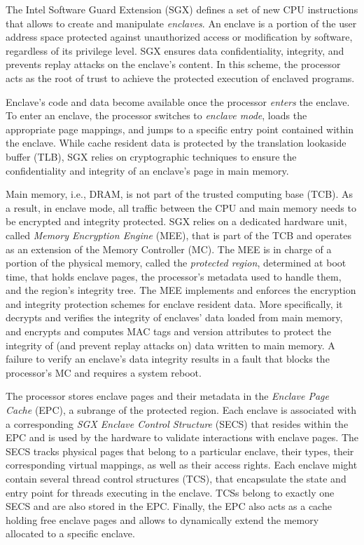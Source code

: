 % 
The Intel Software Guard Extension (SGX) defines a set of new CPU instructions that allows to create and manipulate \emph{enclaves}.
An enclave is a portion of the user address space protected against unauthorized access or modification by software, regardless of its privilege level.
SGX ensures data confidentiality, integrity, and prevents replay attacks on the enclave's content.
In this scheme, the processor acts as the root of trust to achieve the protected execution of enclaved programs.

Enclave's code and data become available once the processor \emph{enters} the enclave.
To enter an enclave, the processor switches to \emph{enclave mode}, loads the appropriate page mappings, and jumps to a specific entry point contained within the enclave.
While cache resident data is protected by the translation lookaside buffer (TLB), SGX relies on cryptographic techniques to ensure the confidentiality and integrity of an enclave's page in main memory.

Main memory, i.e., DRAM, is not part of the trusted computing base (TCB).
As a result, in enclave mode, all traffic between the CPU and main memory needs to be encrypted and integrity protected.
SGX relies on a dedicated hardware unit, called \emph{Memory Encryption Engine} (MEE), that is part of the TCB and operates as an extension of the Memory Controller (MC).
The MEE is in charge of a portion of the physical memory, called the \emph{protected region}, determined at boot time, that holds enclave pages, the processor's metadata used to handle them, and the region's integrity tree.
The MEE implements and enforces the encryption and integrity protection schemes for enclave resident data.
More specifically, it decrypts and verifies the integrity of enclaves' data loaded from main memory, and encrypts and computes MAC tags and version attributes to protect the integrity of (and prevent replay attacks on) data written to main memory.
A failure to verify an enclave's data integrity results in a fault that blocks the processor's MC and requires a system reboot.

The processor stores enclave pages and their metadata in the \emph{Enclave Page Cache} (EPC), a subrange of the protected region.
Each enclave is associated with a corresponding \emph{SGX Enclave Control Structure} (SECS) that resides within the EPC and is used by the hardware to validate interactions with enclave pages.
The SECS tracks physical pages that belong to a particular enclave, their types, their corresponding virtual mappings, as well as their access rights.
Each enclave might contain several thread control structures (TCS), that encapsulate the state and entry point for threads executing in the enclave.
TCSs belong to exactly one SECS and are also stored in the EPC.
Finally, the EPC also acts as a cache holding free enclave pages and allows to dynamically extend the memory allocated to a specific enclave.

